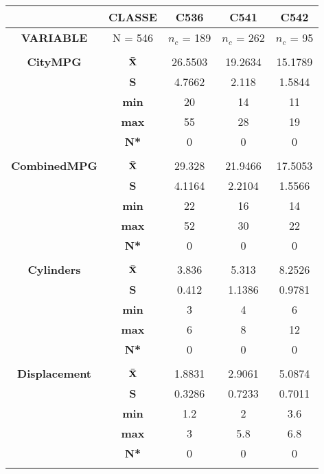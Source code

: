 \newpage

\begin{center}
\begin{tabular}{|c|c||c|c|c|}
\hline
 & {\bf CLASSE } & {\bf C536} & {\bf C541} & {\bf C542}\\
\hline
{\bf VARIABLE} & N = 546 & $n_c$ = 189 & $n_c$ = 262 & $n_c$ = 95\\
\hline
\hline
 &  &  &  & \\  [-2.4ex]
{\bf CityMPG} &  $\bf \bar{X}$ & 26.5503 & 19.2634 & 15.1789 \\
\cline{2-5}
 & {\bf  S} & 4.7662 & 2.118 & 1.5844 \\
\cline{2-5}
 & {\bf  min} & 20 & 14 & 11 \\
\cline{2-5}
 & {\bf  max} & 55 & 28 & 19 \\
\cline{2-5}
 & {\bf  N*} & 0 & 0 & 0 \\
\cline{2-5}
\hline
\hline
 &  &  &  & \\  [-2.4ex]
{\bf CombinedMPG} &  $\bf \bar{X}$ & 29.328 & 21.9466 & 17.5053 \\
\cline{2-5}
 & {\bf  S} & 4.1164 & 2.2104 & 1.5566 \\
\cline{2-5}
 & {\bf  min} & 22 & 16 & 14 \\
\cline{2-5}
 & {\bf  max} & 52 & 30 & 22 \\
\cline{2-5}
 & {\bf  N*} & 0 & 0 & 0 \\
\cline{2-5}
\hline
\hline
 &  &  &  & \\  [-2.4ex]
{\bf Cylinders} &  $\bf \bar{X}$ & 3.836 & 5.313 & 8.2526 \\
\cline{2-5}
 & {\bf  S} & 0.412 & 1.1386 & 0.9781 \\
\cline{2-5}
 & {\bf  min} & 3 & 4 & 6 \\
\cline{2-5}
 & {\bf  max} & 6 & 8 & 12 \\
\cline{2-5}
 & {\bf  N*} & 0 & 0 & 0 \\
\cline{2-5}
\hline
\hline
 &  &  &  & \\  [-2.4ex]
{\bf Displacement} &  $\bf \bar{X}$ & 1.8831 & 2.9061 & 5.0874 \\
\cline{2-5}
 & {\bf  S} & 0.3286 & 0.7233 & 0.7011 \\
\cline{2-5}
 & {\bf  min} & 1.2 & 2 & 3.6 \\
\cline{2-5}
 & {\bf  max} & 3 & 5.8 & 6.8 \\
\cline{2-5}
 & {\bf  N*} & 0 & 0 & 0 \\
\cline{2-5}
\hline
\hline
 &  &  &  & \\  [-2.4ex]

\end{tabular}
\end{center}
